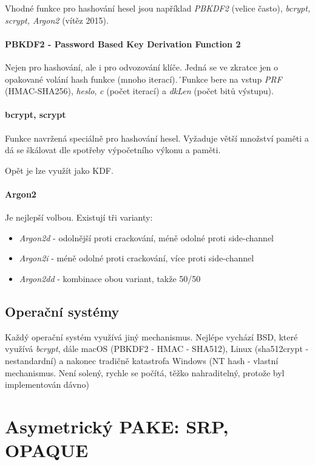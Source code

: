 \documentclass[10pt,a4paper]{article}
\begin{document}
Vhodné funkce pro hashování hesel jsou například \textit{PBKDF2} (velice často), \textit{bcrypt, scrypt, Argon2} (vítěz 2015).

\paragraph{PBKDF2 - Password Based Key Derivation Function 2}
Nejen pro hashování, ale i pro odvozování klíče. 
Jedná se ve zkratce jen o opakované volání hash funkce (mnoho iterací).´Funkce bere na vstup \textit{PRF} (HMAC-SHA256), \textit{heslo}, \textit{c} (počet iterací) a \textit{dkLen} (počet bitů výstupu).

\paragraph{bcrypt, scrypt}

Funkce navržená speciálně pro hashování hesel. Vyžaduje větší množství paměti a dá se škálovat dle spotřeby výpočetního výkonu a paměti.

Opět je lze využít jako KDF. 

\paragraph{Argon2}
Je nejlepší volbou. Existují tři varianty:
\begin{itemize}
	\item \textit{Argon2d} - odolnější proti crackování, méně odolné proti side-channel
	\item \textit{Argon2i} - méně odolné proti crackování, více proti side-channel
	\item \textit{Argon2dd} - kombinace obou variant, takže 50/50
\end{itemize}

\subsection{Operační systémy}

Každý operační systém využívá jiný mechanismus. 
Nejlépe vychází BSD, které využívá \textit{bcrypt}, dále macOS (PBKDF2 - HMAC - SHA512), Linux (sha512crypt - nestandardní) a nakonec tradičně katastrofa Windows (NT hash - vlastní mechanismus. Není solený, rychle se počítá, těžko nahraditelný, protože byl implementován dávno)

\section{Asymetrický PAKE: SRP, OPAQUE}
\end{document}
